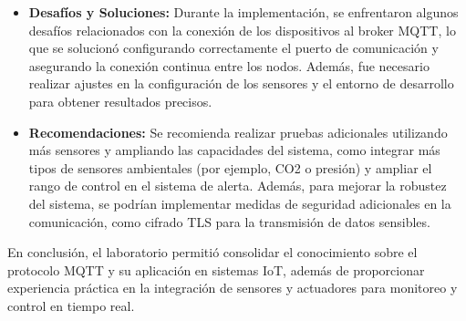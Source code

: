 \begin{itemize}
    \item \textbf{Desafíos y Soluciones:} Durante la implementación, se enfrentaron algunos desafíos relacionados con la conexión de los dispositivos al broker MQTT, lo que se solucionó configurando correctamente el puerto de comunicación y asegurando la conexión continua entre los nodos. Además, fue necesario realizar ajustes en la configuración de los sensores y el entorno de desarrollo para obtener resultados precisos.

    \item \textbf{Recomendaciones:} Se recomienda realizar pruebas adicionales utilizando más sensores y ampliando las capacidades del sistema, como integrar más tipos de sensores ambientales (por ejemplo, CO2 o presión) y ampliar el rango de control en el sistema de alerta. Además, para mejorar la robustez del sistema, se podrían implementar medidas de seguridad adicionales en la comunicación, como cifrado TLS para la transmisión de datos sensibles.
\end{itemize}

En conclusión, el laboratorio permitió consolidar el conocimiento sobre el protocolo MQTT y su aplicación en sistemas IoT, además de proporcionar experiencia práctica en la integración de sensores y actuadores para monitoreo y control en tiempo real.
